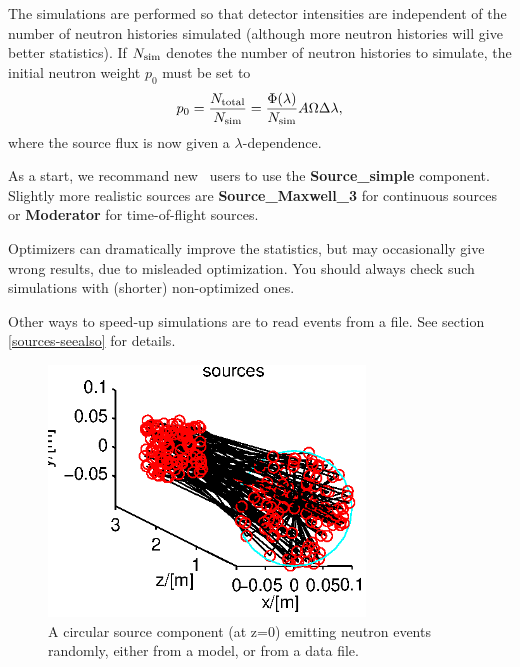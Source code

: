 The simulations are performed so that detector intensities
are independent of the number of neutron histories simulated
(although more neutron histories will give better statistics).
If $N_{\rm sim}$ denotes the number of
neutron histories to simulate, the initial neutron weight $p_0$ must be set to
\begin{equation}
p_0 = \frac{N_{\rm total}}{N_{\rm sim}} =
    \frac{\Phi(\lambda)}{N_{\rm sim}} A \Omega \Delta\lambda ,
\end{equation}
where the source flux is now given a $\lambda$-dependence.

As a start, we recommand new \MCS\ users to use the
{\bf Source\_simple} component.
Slightly more realistic sources are {\bf Source\_Maxwell\_3} for
continuous sources or {\bf Moderator} for time-of-flight sources.

Optimizers can dramatically improve the statistics, but may occasionally
give wrong results, due to misleaded optimization.
You should always check such simulations with (shorter) non-optimized ones.

Other ways to speed-up simulations are to read events from a file.
See section \ref{sources-seealso} for details.

\begin{figure}
  \begin{center}
    \includegraphics[width=0.75\textwidth]{figures/sources.eps}
  \end{center}
\caption{A circular source component (at z=0) emitting neutron events randomly, either from a model, or from a data file.}
\label{f:source}
\end{figure}

\newpage




